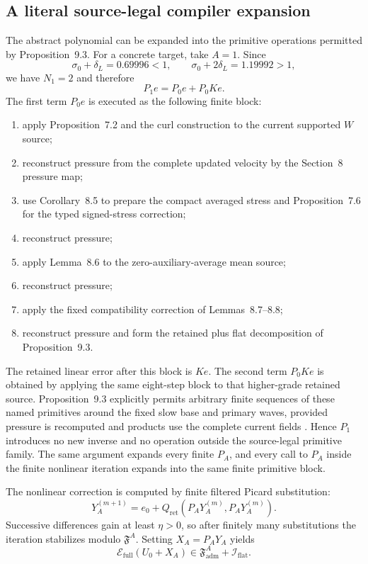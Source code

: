\documentclass[11pt]{article}
\numberwithin{equation}{section}
\theoremstyle{highend}
\theoremstyle{definition}
\newcommand{\F}{\mathfrak F}
\newcommand{\Fadm}{\mathfrak F_{\mathrm{adm}}}
\newcommand{\Efull}{\mathcal E_{\mathrm{full}}}
\newcommand{\Qret}{Q_{\mathrm{ret}}}
\newcommand{\Iflat}{\mathcal I_{\mathrm{flat}}}
\begin{document}
\subsection{A literal source-legal compiler expansion}
The abstract polynomial can be expanded into the primitive operations permitted by Proposition~9.3. For a concrete target, take $A=1$. Since
\[
\sigma_0+\delta_L=0.69996<1,
\qquad
\sigma_0+2\delta_L=1.19992>1,
\]
we have $N_1=2$ and therefore
\[
P_1e=P_0e+P_0Ke.
\]
The first term $P_0e$ is executed as the following finite block:
\begin{enumerate}
  \item apply Proposition~7.2 and the curl construction to the current supported $W$ source;
  \item reconstruct pressure from the complete updated velocity by the Section~8 pressure map;
  \item use Corollary~8.5 to prepare the compact averaged stress and Proposition~7.6 for the typed signed-stress correction;
  \item reconstruct pressure;
  \item apply Lemma~8.6 to the zero-auxiliary-average mean source;
  \item reconstruct pressure;
  \item apply the fixed compatibility correction of Lemmas~8.7--8.8;
  \item reconstruct pressure and form the retained plus flat decomposition of Proposition~9.3.
\end{enumerate}
The retained linear error after this block is $Ke$. The second term $P_0Ke$ is obtained by applying the same eight-step block to that higher-grade retained source. Proposition~9.3 explicitly permits arbitrary finite sequences of these named primitives around the fixed slow base and primary waves, provided pressure is recomputed and products use the complete current fields \cite[pp.~103--105]{OpenAI2026NS}. Hence $P_1$ introduces no new inverse and no operation outside the source-legal primitive family. The same argument expands every finite $P_A$, and every call to $P_A$ inside the finite nonlinear iteration expands into the same finite primitive block.

The nonlinear correction is computed by finite filtered Picard substitution:
\[
Y_A^{(m+1)}=e_0+\Qret(P_AY_A^{(m)},P_AY_A^{(m)}).
\]
Successive differences gain at least $\eta>0$, so after finitely many substitutions the iteration stabilizes modulo $\F^A$. Setting $X_A=P_AY_A$ yields
\[
\Efull(U_0+X_A)\in \Fadm^A+\Iflat.
\]
\end{document}
